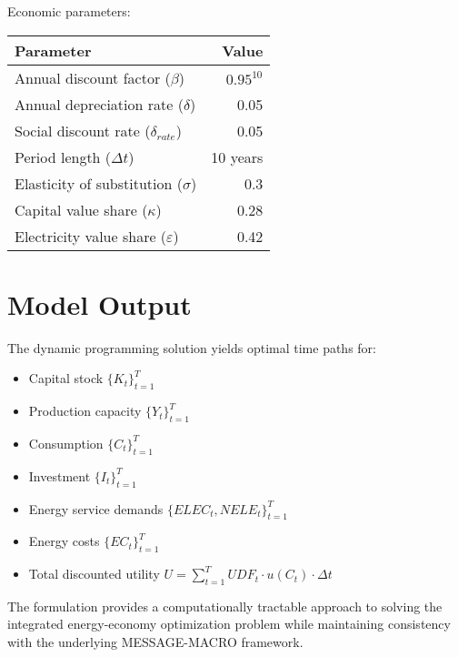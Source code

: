 \documentclass{article}
\begin{document}
Economic parameters:
\begin{center}
\begin{tabular}{lr}
\toprule
Parameter & Value \\
\midrule
Annual discount factor ($\beta$) & $0.95^{10}$ \\
Annual depreciation rate ($\delta$) & 0.05 \\
Social discount rate ($\delta_{rate}$) & 0.05 \\
Period length ($\Delta t$) & 10 years \\
Elasticity of substitution ($\sigma$) & 0.3 \\
Capital value share ($\kappa$) & 0.28 \\
Electricity value share ($\varepsilon$) & 0.42 \\
\bottomrule
\end{tabular}
\end{center}

\section{Model Output}

The dynamic programming solution yields optimal time paths for:
\begin{itemize}
\item Capital stock $\{K_t\}_{t=1}^T$
\item Production capacity $\{Y_t\}_{t=1}^T$ 
\item Consumption $\{C_t\}_{t=1}^T$
\item Investment $\{I_t\}_{t=1}^T$
\item Energy service demands $\{ELEC_t, NELE_t\}_{t=1}^T$
\item Energy costs $\{EC_t\}_{t=1}^T$
\item Total discounted utility $U = \sum_{t=1}^T UDF_t \cdot u(C_t) \cdot \Delta t$
\end{itemize}

The formulation provides a computationally tractable approach to solving the integrated energy-economy optimization problem while maintaining consistency with the underlying MESSAGE-MACRO framework.
\end{document}
